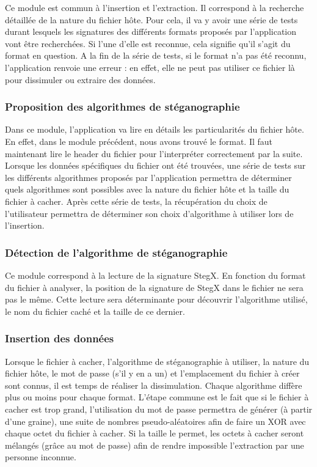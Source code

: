 \documentclass[11pt]{article}
\begin{document}
Ce module est commun à l'insertion et l'extraction. Il correspond à la 
recherche détaillée de la nature du fichier hôte. 
Pour cela, il va y avoir une série de tests durant lesquels les
signatures des différents formats proposés par l'application vont être recherchées. 
Si l'une d'elle est reconnue, cela signifie qu'il s'agit du format en question. 
A la fin de la série de tests, si le format n'a pas été reconnu, 
l'application renvoie une erreur : en effet, elle ne peut pas utiliser ce 
fichier là pour dissimuler ou extraire des données. 

\subsubsection{Proposition des algorithmes de stéganographie}

Dans ce module, l'application va lire en détails les particularités du fichier 
hôte. En effet, dans le module précédent, nous avons trouvé le format. Il 
faut maintenant lire le header du fichier pour l'interpréter correctement 
par la suite. Lorsque les données spécifiques du fichier ont été trouvées, 
une série de tests sur les différents algorithmes proposés par l'application
permettra de déterminer quels algorithmes sont possibles avec la nature 
du fichier hôte et la taille du fichier à cacher. 
Après cette série de tests, la récupération du choix de l'utilisateur 
permettra de déterminer son choix d'algorithme à utiliser lors de l'insertion. 

\subsubsection{Détection de l'algorithme de stéganographie}

Ce module correspond à la lecture de la signature StegX. En fonction du format
du fichier à analyser, la position de la signature de StegX dans le fichier ne
sera pas le même. Cette lecture sera déterminante pour découvrir l'algorithme
utilisé, le nom du fichier caché et la taille de ce dernier. 

\subsubsection{Insertion des données}

Lorsque le fichier à cacher, l'algorithme de stéganographie à utiliser, 
la nature du fichier hôte, le mot de passe (s'il y en a un) et l'emplacement 
du fichier à créer sont connus, il est temps de réaliser la dissimulation. 
Chaque algorithme diffère plus ou moins pour chaque format. 
L'étape commune est le fait que si le fichier à cacher est trop grand, 
l'utilisation du mot de passe permettra de générer (à partir d'une graine), 
une suite de nombres pseudo-aléatoires afin de faire un XOR avec chaque 
octet du fichier à cacher. Si la taille le permet, les octets à cacher 
seront mélangés (grâce au mot de passe) afin de rendre impossible l'extraction 
par une personne inconnue. 
\end{document}
